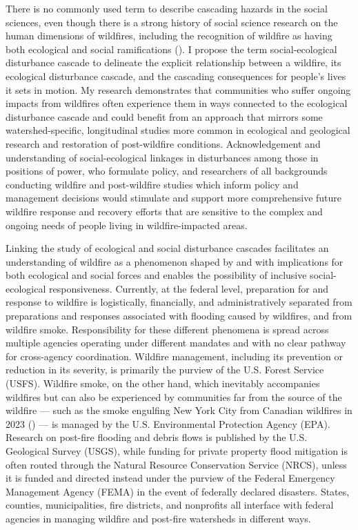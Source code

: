 \documentclass[
]{article}
\begin{document}
There is no commonly used term to describe cascading hazards in the social sciences, even though there is a strong history of social science research on the human dimensions of wildfires, including the recognition of wildfire as having both ecological and social ramifications (). I propose the term social-ecological disturbance cascade to delineate the explicit relationship between a wildfire, its ecological disturbance cascade, and the cascading consequences for people's lives it sets in motion. My research demonstrates that communities who suffer ongoing impacts from wildfires often experience them in ways connected to the ecological disturbance cascade and could benefit from an approach that mirrors some watershed-specific, longitudinal studies more common in ecological and geological research and restoration of post-wildfire conditions. Acknowledgement and understanding of social-ecological linkages in disturbances among those in positions of power, who formulate policy, and researchers of all backgrounds conducting wildfire and post-wildfire studies which inform policy and management decisions would stimulate and support more comprehensive future wildfire response and recovery efforts that are sensitive to the complex and ongoing needs of people living in wildfire-impacted areas.

Linking the study of ecological and social disturbance cascades facilitates an understanding of wildfire as a phenomenon shaped by and with implications for both ecological and social forces and enables the possibility of inclusive social-ecological responsiveness. Currently, at the federal level, preparation for and response to wildfire is logistically, financially, and administratively separated from preparations and responses associated with flooding caused by wildfires, and from wildfire smoke. Responsibility for these different phenomena is spread across multiple agencies operating under different mandates and with no clear pathway for cross-agency coordination. Wildfire management, including its prevention or reduction in its severity, is primarily the purview of the U.S. Forest Service (USFS). Wildfire smoke, on the other hand, which inevitably accompanies wildfires but can also be experienced by communities far from the source of the wildfire --- such as the smoke engulfing New York City from Canadian wildfires in 2023 () --- is managed by the U.S. Environmental Protection Agency (EPA). Research on post-fire flooding and debris flows is published by the U.S. Geological Survey (USGS), while funding for private property flood mitigation is often routed through the Natural Resource Conservation Service (NRCS), unless it is funded and directed instead under the purview of the Federal Emergency Management Agency (FEMA) in the event of federally declared disasters. States, counties, municipalities, fire districts, and nonprofits all interface with federal agencies in managing wildfire and post-fire watersheds in different ways.
\end{document}
